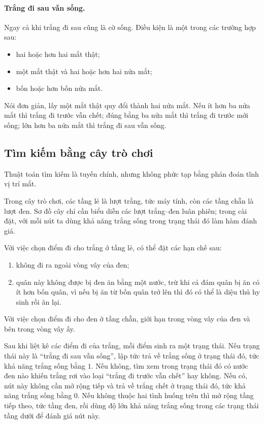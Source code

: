 \documentclass[11pt]{article}
\begin{document}
\paragraph{Trắng đi sau vẫn sống.}
Ngay cả khi trắng đi sau cũng là cờ sống. Điều kiện là một trong các trường
hợp sau:
\begin{itemize}
  \item hai hoặc hơn hai mắt thật;
  \item một mắt thật và hai hoặc hơn hai nửa mắt;
  \item bốn hoặc hơn bốn nửa mắt.
\end{itemize}

Nói đơn giản, lấy một mắt thật quy đổi thành hai nửa mắt. Nếu ít hơn ba nửa
mắt thì trắng đi trước vẫn chết; đúng bằng ba nửa mắt thì trắng đi trước mới
sống; lớn hơn ba nửa mắt thì trắng đi sau vẫn sống.

\subsection{Tìm kiếm bằng cây trò chơi}

Thuật toán tìm kiếm là tuyến chính, nhưng không phức tạp bằng phán đoán tĩnh
vị trí mắt.

Trong cây trò chơi, các tầng lẻ là lượt trắng, tức máy tính, còn các tầng
chẵn là lượt đen. Sơ đồ cây chỉ cần biểu diễn các lượt trắng--đen luân phiên;
trong cài đặt, với mỗi nút ta dùng khả năng trắng sống trong trạng thái đó làm
hàm đánh giá.

Với việc chọn điểm đi cho trắng ở tầng lẻ, có thể đặt các hạn chế sau:
\begin{enumerate}
  \item không đi ra ngoài vòng vây của đen;
  \item quân này không được bị đen ăn bằng một nước, trừ khi cả đám quân bị
  ăn có ít hơn bốn quân, vì nếu bị ăn từ bốn quân trở lên thì đó có thể là
  diệu thủ hy sinh rồi ăn lại.
\end{enumerate}

Với việc chọn điểm đi cho đen ở tầng chẵn, giới hạn trong vòng vây của đen và
bên trong vòng vây ấy.

Sau khi liệt kê các điểm đi của trắng, mỗi điểm sinh ra một trạng thái. Nếu
trạng thái này là ``trắng đi sau vẫn sống'', lập tức trả về trắng sống ở
trạng thái đó, tức khả năng trắng sống bằng \(1\). Nếu không, tìm xem trong
trạng thái đó có nước đen nào khiến trắng rơi vào loại ``trắng đi trước vẫn
chết'' hay không. Nếu có, nút này không cần mở rộng tiếp và trả về trắng chết
ở trạng thái đó, tức khả năng trắng sống bằng \(0\). Nếu không thuộc hai tình
huống trên thì mở rộng tầng tiếp theo, tức tầng đen, rồi dùng độ lớn khả năng
trắng sống trong các trạng thái tầng dưới để đánh giá nút này.
\end{document}
